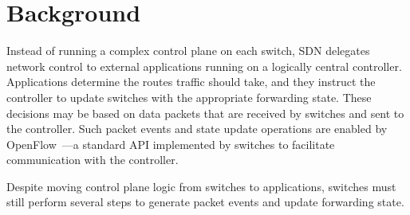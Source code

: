 \section{Background}
\label{sec-motivation}



Instead of running a complex control plane on each switch, SDN delegates
network control to external applications running on a logically central
controller. 
Applications determine the routes traffic should take, and they
instruct the controller to update switches with the appropriate forwarding
state. These decisions may be based on data packets that are
received by switches and sent to the controller. Such packet events and
state update operations are enabled by OpenFlow~\cite{openflow}---a standard
API implemented by switches to facilitate communication with the controller.


Despite moving control plane logic from switches to applications, switches 
must still perform several steps to generate packet events and update
forwarding state.


